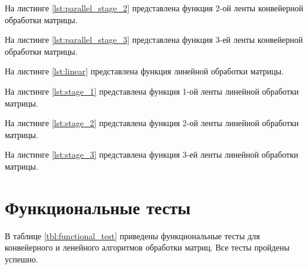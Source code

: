 На листинге \ref{lst:parallel_stage_2} представлена функция 2-ой ленты конвейерной обработки матрицы.

\newpage
На листинге \ref{lst:parallel_stage_3} представлена функция 3-ей ленты конвейерной обработки матрицы.

\newpage
На листинге \ref{lst:linear} представлена функция линейной обработки матрицы.


На листинге \ref{lst:stage_1} представлена функция 1-ой ленты линейной обработки матрицы.


На листинге \ref{lst:stage_2} представлена функция 2-ой ленты линейной обработки матрицы.

\newpage
На листинге \ref{lst:stage_3} представлена функция 3-ей ленты линейной обработки матрицы.

\section{Функциональные тесты}

В таблице \ref{tbl:functional_test} приведены функциональные тесты для конвейерного и ленейного алгоритмов обработки матриц. Все тесты пройдены успешно.

